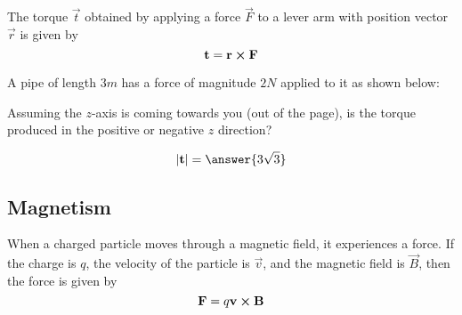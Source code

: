 \documentclass{ximera}
\begin{document}
\begin{definition}
  The torque $\vec{t}$ obtained by applying a force $\vec{F}$ to a
  lever arm with position vector $\vec{r}$ is given by
  \[
  \mathbf{t} = \mathbf{r} \boldsymbol\times \mathbf{F} 
  \]
\end{definition}

\begin{question}
  A pipe of length $3 \unit{m}$ has a force of magnitude $2 \unit{N}$
  applied to it as shown below:
  \begin{image}
  \end{image}
  Assuming the $z$-axis is coming towards you (out of the page), is
  the torque produced in the positive or negative $z$ direction?
  \begin{prompt}
  \begin{multipleChoice}
  \end{multipleChoice}  
  \[
  |\vec{t}| = \answer{3\sqrt{3}}
  \]
  \end{prompt}
\end{question}



\subsection{Magnetism} 

When a charged particle moves through a magnetic field, it experiences
a force.  If the charge is $q$, the velocity of the particle is
$\vec{v}$, and the magnetic field is $\vec{B}$, then the force is
given by
\[
\mathbf{F} = q\mathbf{v} \boldsymbol\times \mathbf{B}
\]
\end{document}
